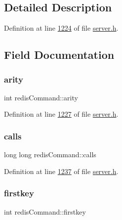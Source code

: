 \subsection{Detailed Description}


Definition at line \hyperlink{server_8h_source_l01224}{1224} of file \hyperlink{server_8h_source}{server.\+h}.



\subsection{Field Documentation}
\mbox{\label{structredisCommand_a9c21ad3c5edaf7afa62d2cc612077fda}} 
\subsubsection{\texorpdfstring{arity}{arity}}
{\footnotesize\ttfamily int redis\+Command\+::arity}



Definition at line \hyperlink{server_8h_source_l01227}{1227} of file \hyperlink{server_8h_source}{server.\+h}.

\mbox{\label{structredisCommand_a02752f0e9997214352bef75edc46a6ab}} 
\subsubsection{\texorpdfstring{calls}{calls}}
{\footnotesize\ttfamily long long redis\+Command\+::calls}



Definition at line \hyperlink{server_8h_source_l01237}{1237} of file \hyperlink{server_8h_source}{server.\+h}.

\mbox{\label{structredisCommand_a7ec037012cba315bc452906108ed9e57}} 
\subsubsection{\texorpdfstring{firstkey}{firstkey}}
{\footnotesize\ttfamily int redis\+Command\+::firstkey}



